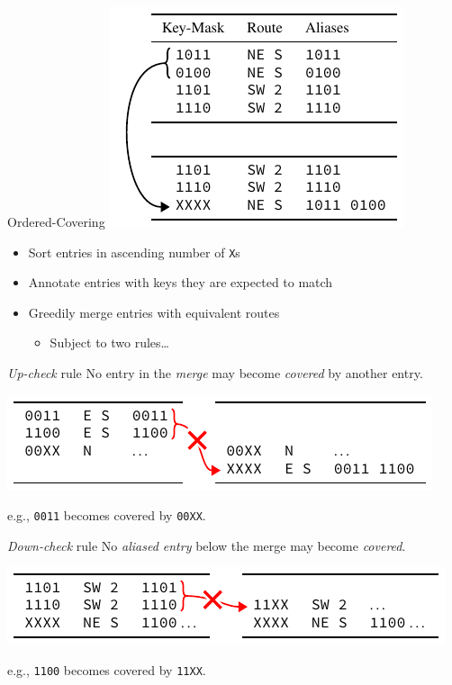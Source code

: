 \documentclass[t]{beamer}
\begin{document}
\begin{frame}{Ordered-Covering}
  \centering
  \includegraphics{../figures/aliases_example}

  \begin{itemize}
    \item Sort entries in ascending number of \texttt{X}s
    \item Annotate entries with keys they are expected to match
    \item Greedily merge entries with equivalent routes
      \begin{itemize}
        \item Subject to two rules\ldots
      \end{itemize}
  \end{itemize}
\end{frame}

\begin{frame}{\emph{Up-check} rule}
  No entry in the \emph{merge} may become \emph{covered} by another entry.

  \begin{center}
    \includegraphics{../figures/rule2a_example}
  \end{center}

  e.g., \texttt{0011} becomes covered by \texttt{00XX}.
\end{frame}

\begin{frame}{\emph{Down-check} rule}
  No \emph{aliased entry} below the merge may become \emph{covered}.

  \begin{center}
    \includegraphics{../figures/rule2b_example}
  \end{center}

  e.g., \texttt{1100} becomes covered by \texttt{11XX}.
\end{frame}
\end{document}
